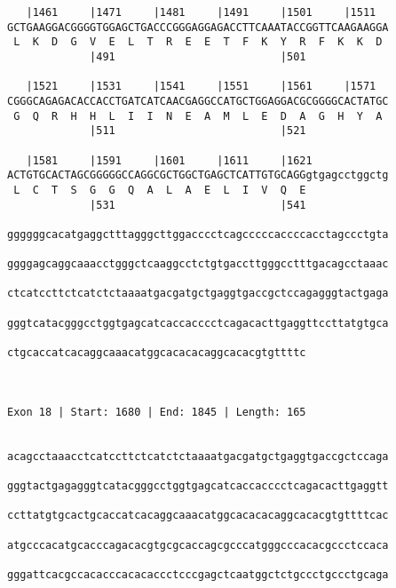 \documentclass{article}
\begin{document}
\begin{Verbatim}
   |1461     |1471     |1481     |1491     |1501     |1511  
GCTGAAGGACGGGGTGGAGCTGACCCGGGAGGAGACCTTCAAATACCGGTTCAAGAAGGA
 L  K  D  G  V  E  L  T  R  E  E  T  F  K  Y  R  F  K  K  D 
             |491                          |501             
  
   |1521     |1531     |1541     |1551     |1561     |1571  
CGGGCAGAGACACCACCTGATCATCAACGAGGCCATGCTGGAGGACGCGGGGCACTATGC
 G  Q  R  H  H  L  I  I  N  E  A  M  L  E  D  A  G  H  Y  A 
             |511                          |521             
  
   |1581     |1591     |1601     |1611     |1621            
ACTGTGCACTAGCGGGGGCCAGGCGCTGGCTGAGCTCATTGTGCAGGgtgagcctggctg
 L  C  T  S  G  G  Q  A  L  A  E  L  I  V  Q  E             
             |531                          |541             
  
ggggggcacatgaggctttagggcttggacccctcagcccccaccccacctagccctgta
                                                            
ggggagcaggcaaacctgggctcaaggcctctgtgaccttgggcctttgacagcctaaac
                                                            
ctcatccttctcatctctaaaatgacgatgctgaggtgaccgctccagagggtactgaga
                                                            
gggtcatacgggcctggtgagcatcaccacccctcagacacttgaggttccttatgtgca
                                                            
ctgcaccatcacaggcaaacatggcacacacaggcacacgtgttttc
                                               
                                               
 
Exon 18 | Start: 1680 | End: 1845 | Length: 165


acagcctaaacctcatccttctcatctctaaaatgacgatgctgaggtgaccgctccaga
                                                            
gggtactgagagggtcatacgggcctggtgagcatcaccacccctcagacacttgaggtt
                                                            
ccttatgtgcactgcaccatcacaggcaaacatggcacacacaggcacacgtgttttcac
                                                            
atgcccacatgcacccagacacgtgcgcaccagcgcccatgggcccacacgccctccaca
                                                            
gggattcacgccacacccacacaccctcccgagctcaatggctctgccctgccctgcaga
                                                            

\end{Verbatim}
\end{document}
